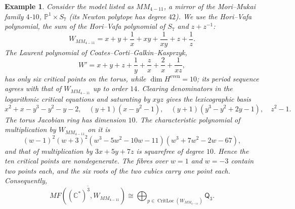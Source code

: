 \documentclass[11pt]{amsart}
\newtheorem{example}{Example}[section]
\DeclareMathOperator{\CritLoc}{CritLoc}
\newcommand{\MorseCat}[1]{\mathsf{Q}_{#1}}
\begin{document}
\begin{example}
Consider the model listed as $MM_{4-11}$, a mirror of the Mori--Mukai family
$4$-$10$, $\mathbb{P}^1\times S_7$ (its Newton polytope has degree $42$).
We use the Hori--Vafa polynomial, the sum of the Hori--Vafa polynomial of
$S_7$ and $z+z^{-1}$:
\[
W_{MM_{4-11}}=x+y+\frac{1}{x}+xy+\frac{1}{xy}+z+\frac{1}{z}.
\]
The Laurent polynomial of Coates--Corti--Galkin--Kasprzyk,
\[
W'=x+y+z+\frac{1}{y}+\frac{z}{x}+\frac{2}{x}+\frac{1}{xz},
\]
has only six critical points on the torus, while $\dim H^{\mathrm{even}}=10$;
its period sequence agrees with that of $W_{MM_{4-11}}$ up to order $14$.
Clearing denominators in
the logarithmic critical equations and saturating by $xyz$ gives the
lexicographic basis
\[
x^2+x-y^3-y^2-y-2,\quad
(y+1)(x-y^2-1),\quad
(y+1)(y^3-y^2+2y-1),\quad
z^2-1.
\]
The torus Jacobian ring has dimension $10$. The characteristic polynomial of
multiplication by $W_{MM_{4-11}}$ on it is
\[
(w-1)^2(w+3)^2(w^3-5w^2-10w-11)(w^3+7w^2-2w-67),
\]
and that of multiplication by $3x+5y+7z$ is squarefree of degree $10$. Hence
the ten critical points are nondegenerate. The fibres over $w=1$ and $w=-3$
contain two points each, and the six roots of the two cubics carry one point
each. Consequently,
\[
\overline{MF((\mathbb{C}^*)^3,W_{MM_{4-11}})}
\cong \bigoplus_{p\in\CritLoc(W_{MM_{4-11}})}\MorseCat{3}.
\]
\end{example}
\end{document}
